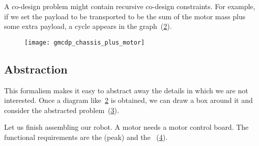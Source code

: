 \begin{example}
    \begin{figure}
        \centering
        \caption{}
        \label{fig:total_cost}
    \end{figure}



    A co-design problem might contain recursive co-design constraints.
    For example, if we set the payload to be transported to be the sum
    of the motor mass plus some extra payload, a cycle appears in the
    graph~(\cref{fig:gmcdp_chassis_plus_motor}).


    \begin{figure}[h!]
        \centering{}
        \texttt{[image: gmcdp\_chassis\_plus\_motor]}
        \caption{}
        \label{fig:gmcdp_chassis_plus_motor}
    \end{figure}


    \FloatBarrier \vfill\clearpage

    \subsection{Abstraction}
    This formalism makes it easy to abstract away the details
    in which we are not interested. Once a diagram like~\cref{fig:gmcdp_chassis_plus_motor}
    is obtained, we can draw a box around it and consider the abstracted
    problem~(\cref{fig:gmcdp_chassis_plus_motor-1}).


    \begin{figure}[h!]
        \centering
        \caption{}
        \label{fig:gmcdp_chassis_plus_motor-1}
    \end{figure}


    \label{exa:finish}Let us finish assembling our robot. A motor needs
    a motor control board. The functional requirements are the (peak)
     and the ~(\cref{fig:mcb}).

    \begin{figure}[h!]
        \centering
        \caption{}
        \label{fig:mcb}
    \end{figure}


\end{example}
